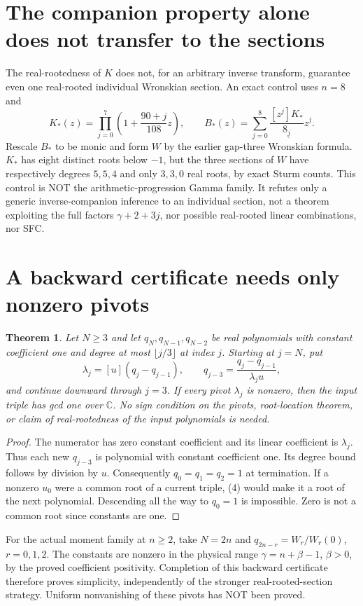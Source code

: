 \documentclass[11pt]{article}
\newtheorem{theorem}{Theorem}
\begin{document}
\section{The companion property alone does not transfer to the sections}
The real-rootedness of $K$ does not, for an arbitrary inverse transform,
guarantee even one real-rooted individual Wronskian section. An exact
control uses $n=8$ and
\[
 K_*(z)=\prod_{j=0}^7\left(1+\frac{90+j}{108}z\right),\qquad
 B_*(z)=\sum_{j=0}^8\frac{[z^j]K_*}{8_{\underline j}}z^j.
\]
Rescale $B_*$ to be monic and form $W$ by the earlier gap-three
Wronskian formula. $K_*$ has eight distinct roots below $-1$, but the
three sections of $W$ have respectively degrees $5,5,4$ and only
$3,3,0$ real roots, by exact Sturm counts.
This control is NOT the arithmetic-progression Gamma family. It refutes
only a generic inverse-companion inference to an individual section,
not a theorem exploiting the full factors $\gamma+2+3j$, nor possible
real-rooted linear combinations, nor SFC.

\section{A backward certificate needs only nonzero pivots}
\begin{theorem}\label{thm:pivots}
Let $N\ge3$ and let $q_N,q_{N-1},q_{N-2}$ be real polynomials with
constant coefficient one and degree at most $\lfloor j/3\rfloor$ at
index $j$. Starting at $j=N$, put
\[
 \lambda_j=[u](q_j-q_{j-1}),\qquad
 q_{j-3}=\frac{q_j-q_{j-1}}{\lambda_ju},                     \tag{4}
\]
and continue downward through $j=3$.
If every pivot $\lambda_j$ is nonzero, then the input triple has gcd
one over $\mathbb C$.
No sign condition on the pivots, root-location theorem, or claim of
real-rootedness of the input polynomials is needed.
\end{theorem}
\begin{proof}
The numerator has zero constant coefficient and its linear coefficient
is $\lambda_j$. Thus each new $q_{j-3}$ is polynomial with constant
coefficient one. Its degree bound follows by division by $u$.
Consequently $q_0=q_1=q_2=1$ at termination.
If a nonzero $u_0$ were a common root of a current triple, (4) would
make it a root of the next polynomial. Descending all the way to
$q_0=1$ is impossible. Zero is not a common root since constants are one.
\end{proof}
For the actual moment family at $n\ge2$, take $N=2n$ and
$q_{2n-r}=W_r/W_r(0)$, $r=0,1,2$.
The constants are nonzero in the physical range $\gamma=n+\beta-1$,
$\beta>0$, by the proved coefficient positivity. Completion of this
backward certificate therefore proves simplicity, independently of the
stronger real-rooted-section strategy. Uniform nonvanishing of these
pivots has NOT been proved.
\end{document}
